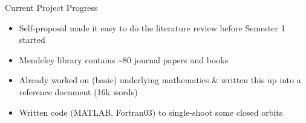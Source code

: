 \documentclass[10pt]{beamer}
\newcommand{\themename}{\textbf{\textsc{metropolis}}\xspace}
\begin{document}
%



\begin{frame}{Current Project Progress}
	\begin{itemize}
		\item Self-proposal made it easy to do the literature review before Semester 1 started
		\item Mendeley library contains \textasciitilde 80 journal papers and books
		\item Already worked on (basic) underlying mathematics \& written this up into a reference document (16k words)
		\item Written code (MATLAB, Fortran03) to single-shoot some closed orbits
	\end{itemize}
\end{frame}
\end{document}
